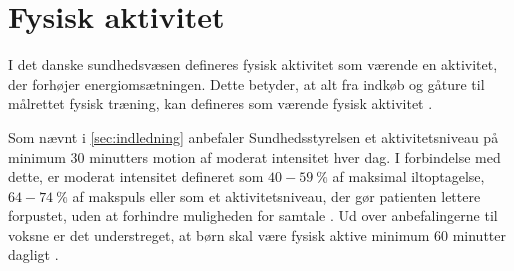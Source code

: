 \section{Fysisk aktivitet}\label{sec:prob_fysaktiv}

I det danske sundhedsvæsen defineres fysisk aktivitet som værende en aktivitet, der forhøjer energiomsætningen. Dette betyder, at alt fra indkøb og gåture til målrettet fysisk træning, kan defineres som værende fysisk aktivitet \citep{motionsraad2007, terkelsen2015}.

Som nævnt i \autoref{sec:indledning} anbefaler Sundhedsstyrelsen et aktivitetsniveau på minimum 30 minutters motion af moderat intensitet hver dag. I forbindelse med dette, er moderat intensitet defineret som $40-59~\%$ af maksimal iltoptagelse, $64-74~\%$ af makspuls eller som et aktivitetsniveau, der gør patienten lettere forpustet, uden at forhindre muligheden for samtale \citep{motionsraad2007}.
Ud over anbefalingerne til voksne er det understreget, at børn skal være fysisk aktive minimum 60 minutter dagligt \citep{pedersen2011}. 
